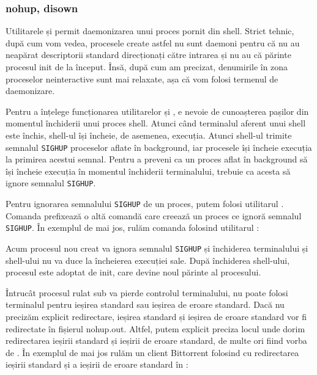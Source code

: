 \subsubsection{nohup, disown}
\label{sec:procese-interactivitate-detasare-nohup}

Utilitarele  și  permit daemonizarea unui proces pornit din shell.
Strict tehnic, după cum vom vedea, procesele create astfel nu sunt daemoni pentru că nu
au neapărat descriptorii standard direcționați către intrarea  și nu au
că părinte procesul init de la început. Însă, după cum am precizat, denumirile
în zona proceselor neinteractive sunt mai relaxate, așa că vom folosi termenul
de daemonizare.

Pentru a înțelege funcționarea utilitarelor  și , e nevoie de
cunoașterea pașilor din momentul închiderii unui proces shell. Atunci când
terminalul aferent unui shell este închis, shell-ul își încheie, de asemenea, execuția.
Atunci shell-ul trimite semnalul \texttt{SIGHUP} proceselor aflate în background, iar
procesele își încheie execuția la primirea acestui semnal. Pentru a preveni ca
un proces aflat în background să își încheie execuția în momentul închiderii
terminalului, trebuie ca acesta să ignore semnalul \texttt{SIGHUP}.


Pentru ignorarea semnalului \texttt{SIGHUP} de un proces, putem folosi utilitarul .
Comanda  prefixează o altă comandă care creează un proces ce ignoră
semnalul \texttt{SIGHUP}. În exemplul de mai jos, rulăm comanda  folosind
utilitarul :


Acum procesul  nou creat va ignora semnalul \texttt{SIGHUP} și închiderea
terminalului și shell-ului nu va duce la încheierea execuției sale. După
închiderea shell-ului, procesul este adoptat de init, care devine noul părinte
al procesului.

Întrucât procesul rulat sub  va pierde controlul terminalului, nu poate
folosi terminalul pentru ieșirea standard sau ieșirea de eroare standard. Dacă
nu precizăm explicit redirectare, ieșirea standard și ieșirea de eroare standard
vor fi redirectate în fișierul nohup.out. Altfel, putem explicit preciza locul
unde dorim redirectarea ieșirii standard și ieșirii de eroare standard, de multe
ori fiind vorba de . În exemplul de mai jos rulăm un client Bittorrent
folosind  cu redirectarea ieșirii standard și a ieșirii de eroare standard
în :

